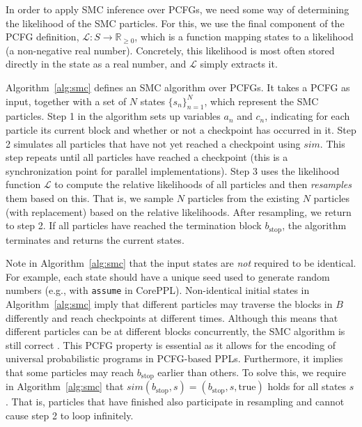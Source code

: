 \documentclass[runningheads]{llncs}
\newcommand{\clstinline}{\lstinline[language=CorePPL]}
\begin{document}
In order to apply SMC inference over PCFGs, we need some way of determining the likelihood of the SMC particles.
For this, we use the final component of the PCFG definition, $\mathcal{L}: S \rightarrow \mathbb{R}_{\geq0}$, which is a function mapping states to a likelihood (a non-negative real number).
Concretely, this likelihood is most often stored directly in the state as a real number, and $\mathcal{L}$ simply extracts it.

Algorithm~\ref{alg:smc} defines an SMC algorithm over PCFGs.
It takes a PCFG as input, together with a set of $N$ states $\{s_n\}_{n=1}^N$, which represent the SMC particles.
Step 1 in the algorithm sets up variables $a_n$ and $c_n$, indicating for each particle its current block and whether or not a checkpoint has occurred in it.
Step 2 simulates all particles that have not yet reached a checkpoint using $\mathit{sim}$.
This step repeats until all particles have reached a checkpoint (this is a synchronization point for parallel implementations).
Step 3 uses the likelihood function $\mathcal{L}$ to compute the relative likelihoods of all particles and then \emph{resamples} them based on this.
That is, we sample $N$ particles from the existing $N$ particles (with replacement) based on the relative likelihoods.
After resampling, we return to step 2.
If all particles have reached the termination block $b_\text{stop}$, the algorithm terminates and returns the current states.

Note in Algorithm~\ref{alg:smc} that the input states are \emph{not} required to be identical.
For example, each state should have a unique seed used to generate random numbers (e.g., with \clstinline!assume! in CorePPL).
Non-identical initial states in Algorithm~\ref{alg:smc} imply that different particles may traverse the blocks in $B$ differently and reach checkpoints at different times.
Although this means that different particles can be at different blocks concurrently, the SMC algorithm is still correct \cite{lunden2021correctness}.
This PCFG property is essential as it allows for the encoding of universal probabilistic programs in PCFG-based PPLs.
Furthermore, it implies that some particles may reach $b_\text{stop}$ earlier than others.
To solve this, we require in Algorithm~\ref{alg:smc} that $\mathit{sim}(b_\text{stop},s) = (b_\text{stop},s,\text{true})$ holds for all states $s$.
That is, particles that have finished also participate in resampling and cannot cause step 2 to loop infinitely.
\end{document}
